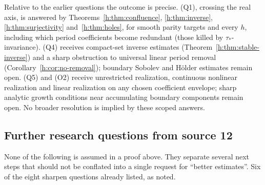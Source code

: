 \documentclass[11pt,a4paper]{article}
\numberwithin{equation}{section}
\theoremstyle{definition}
\theoremstyle{remark}
\theoremstyle{plain}
\begin{document}
Relative to the earlier questions the outcome is precise. (Q1), crossing the
real axis, is answered by Theorems~\ref{h:thm:confluence},
\ref{h:thm:inverse}, \ref{h:thm:surjectivity} and~\ref{h:thm:holes}, for smooth
parity targets and every $h$, including which period coefficients become
redundant (those killed by $\tau_*$-invariance). (Q4) receives compact-set
inverse estimates (Theorem~\ref{h:thm:stable-inverse}) and a sharp obstruction
to universal linear period removal (Corollary~\ref{h:cor:no-removal}); boundary
Sobolev and H\"older estimates remain open. (Q5) and (O2) receive unrestricted
realization, continuous nonlinear realization and linear realization on any
chosen coefficient envelope; sharp analytic growth conditions near
accumulating boundary components remain open. No broader resolution is implied
by these scoped answers.

\subsection{Further research questions from source 12}
\label{h:sec:future}

None of the following is assumed in a proof above. They separate several next
steps that should not be conflated into a single request for ``better
estimates''. Six of the eight sharpen questions already listed, as noted.
\end{document}
